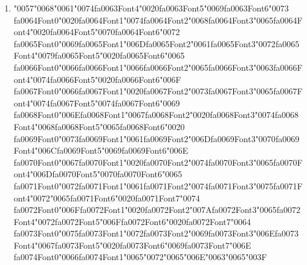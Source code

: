 \documentclass[12pt]{article}
\begin{document}
\begin{enumerate}[label=Q\arabic*.]
\item {\char"0057}{\char"0068}{\char"0061}{\char"0074}{\csname fa0063Font4\endcsname\char"0020}{\csname fa0063Font5\endcsname\char"0069}{\csname fa0063Font6\endcsname\char"0073} {\csname fa0064Font0\endcsname\char"0020}{\csname fa0064Font1\endcsname\char"0074}{\csname fa0064Font2\endcsname\char"0068}{\csname fa0064Font3\endcsname\char"0065}{\csname fa0064Font4\endcsname\char"0020}{\csname fa0064Font5\endcsname\char"0070}{\csname fa0064Font6\endcsname\char"0072} {\csname fa0065Font0\endcsname\char"0069}{\csname fa0065Font1\endcsname\char"006D}{\csname fa0065Font2\endcsname\char"0061}{\csname fa0065Font3\endcsname\char"0072}{\csname fa0065Font4\endcsname\char"0079}{\csname fa0065Font5\endcsname\char"0020}{\csname fa0065Font6\endcsname\char"0065} {\csname fa0066Font0\endcsname\char"0066}{\csname fa0066Font1\endcsname\char"0066}{\csname fa0066Font2\endcsname\char"0065}{\csname fa0066Font3\endcsname\char"0063}{\csname fa0066Font4\endcsname\char"0074}{\csname fa0066Font5\endcsname\char"0020}{\csname fa0066Font6\endcsname\char"006F} {\csname fa0067Font0\endcsname\char"0066}{\csname fa0067Font1\endcsname\char"0020}{\csname fa0067Font2\endcsname\char"0073}{\csname fa0067Font3\endcsname\char"0065}{\csname fa0067Font4\endcsname\char"0074}{\csname fa0067Font5\endcsname\char"0074}{\csname fa0067Font6\endcsname\char"0069} {\csname fa0068Font0\endcsname\char"006E}{\csname fa0068Font1\endcsname\char"0067}{\csname fa0068Font2\endcsname\char"0020}{\csname fa0068Font3\endcsname\char"0074}{\csname fa0068Font4\endcsname\char"0068}{\csname fa0068Font5\endcsname\char"0065}{\csname fa0068Font6\endcsname\char"0020} {\csname fa0069Font0\endcsname\char"0073}{\csname fa0069Font1\endcsname\char"0061}{\csname fa0069Font2\endcsname\char"006D}{\csname fa0069Font3\endcsname\char"0070}{\csname fa0069Font4\endcsname\char"006C}{\csname fa0069Font5\endcsname\char"0069}{\csname fa0069Font6\endcsname\char"006E} {\csname fa0070Font0\endcsname\char"0067}{\csname fa0070Font1\endcsname\char"0020}{\csname fa0070Font2\endcsname\char"0074}{\csname fa0070Font3\endcsname\char"0065}{\csname fa0070Font4\endcsname\char"006D}{\csname fa0070Font5\endcsname\char"0070}{\csname fa0070Font6\endcsname\char"0065} {\csname fa0071Font0\endcsname\char"0072}{\csname fa0071Font1\endcsname\char"0061}{\csname fa0071Font2\endcsname\char"0074}{\csname fa0071Font3\endcsname\char"0075}{\csname fa0071Font4\endcsname\char"0072}{\char"0065}{\csname fa0071Font6\endcsname\char"0020}{\csname fa0071Font7\endcsname\char"0074} {\csname fa0072Font0\endcsname\char"006F}{\csname fa0072Font1\endcsname\char"0020}{\csname fa0072Font2\endcsname\char"007A}{\csname fa0072Font3\endcsname\char"0065}{\csname fa0072Font4\endcsname\char"0072}{\csname fa0072Font5\endcsname\char"006F}{\csname fa0072Font6\endcsname\char"0020}{\csname fa0072Font7\endcsname\char"0064} {\csname fa0073Font0\endcsname\char"0075}{\csname fa0073Font1\endcsname\char"0072}{\csname fa0073Font2\endcsname\char"0069}{\csname fa0073Font3\endcsname\char"006E}{\csname fa0073Font4\endcsname\char"0067}{\csname fa0073Font5\endcsname\char"0020}{\csname fa0073Font6\endcsname\char"0069}{\csname fa0073Font7\endcsname\char"006E} {\csname fa0074Font0\endcsname\char"0066}{\csname fa0074Font1\endcsname\char"0065}{\char"0072}{\char"0065}{\char"006E}{\char"0063}{\char"0065}{\char"003F}

\end{enumerate}
\end{document}
